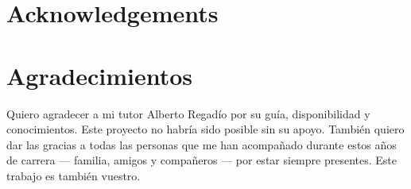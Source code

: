 %
%
%
% 
%
%
%
%

\thispagestyle{empty}

{
  \chapter*{Acknowledgements}
  \label{cha:acknowledgements}
}
{
  \chapter*{Agradecimientos}
  \label{cha:agradecimientos}
}




Quiero agradecer a mi tutor Alberto Regadío por su guía, disponibilidad y conocimientos. Este proyecto no habría sido posible sin su apoyo. También quiero dar las gracias a todas las personas que me han acompañado durante estos años de carrera — familia, amigos y compañeros — por estar siempre presentes. Este trabajo es también vuestro.





